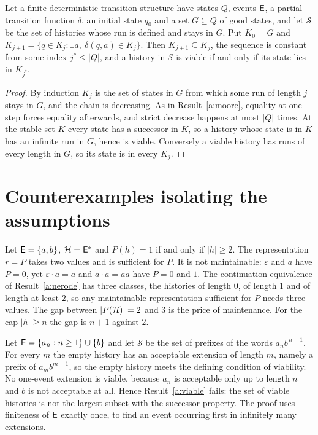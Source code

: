 \begin{newresult}\label{a:kernel}
Let a finite deterministic transition structure have states $Q$, events $\mathsf{E}$, a partial transition function $\delta$, an initial state $q_0$ and a set $G\subseteq Q$ of good states, and let $\mathcal S$ be the set of histories whose run is defined and stays in $G$. Put $K_0=G$ and $K_{j+1}=\{q\in K_j:\exists a,\ \delta(q,a)\in K_j\}$. Then $K_{j+1}\subseteq K_j$, the sequence is constant from some index $j^{*}\le|Q|$, and a history in $\mathcal S$ is viable if and only if its state lies in $K_{j^{*}}$.
\end{newresult}
\begin{proof}
By induction $K_j$ is the set of states in $G$ from which some run of length $j$ stays in $G$, and the chain is decreasing. As in Result~\ref{a:moore}, equality at one step forces equality afterwards, and strict decrease happens at most $|Q|$ times. At the stable set $K$ every state has a successor in $K$, so a history whose state is in $K$ has an infinite run in $G$, hence is viable. Conversely a viable history has runs of every length in $G$, so its state is in every $K_j$.
\end{proof}

\section{Counterexamples isolating the assumptions}

\begin{counterexample}\label{a:ce-maintain}
Let $\mathsf{E}=\{a,b\}$, $\mathcal{H}=\mathsf{E}^{*}$ and $P(h)=1$ if and only if $|h|\ge2$. The representation $r=P$ takes two values and is sufficient for $P$. It is not maintainable: $\varepsilon$ and $a$ have $P=0$, yet $\varepsilon\cdot a=a$ and $a\cdot a=aa$ have $P=0$ and $1$. The continuation equivalence of Result~\ref{a:nerode} has three classes, the histories of length $0$, of length $1$ and of length at least $2$, so any maintainable representation sufficient for $P$ needs three values. The gap between $|P(\mathcal{H})|=2$ and $3$ is the price of maintenance. For the cap $|h|\ge n$ the gap is $n+1$ against $2$.
\end{counterexample}

\begin{counterexample}\label{a:ce-alphabet}
Let $\mathsf{E}=\{a_n:n\ge1\}\cup\{b\}$ and let $\mathcal S$ be the set of prefixes of the words $a_nb^{\,n-1}$. For every $m$ the empty history has an acceptable extension of length $m$, namely a prefix of $a_mb^{m-1}$, so the empty history meets the defining condition of viability. No one-event extension is viable, because $a_n$ is acceptable only up to length $n$ and $b$ is not acceptable at all. Hence Result~\ref{a:viable} fails: the set of viable histories is not the largest subset with the successor property. The proof uses finiteness of $\mathsf{E}$ exactly once, to find an event occurring first in infinitely many extensions.
\end{counterexample}

